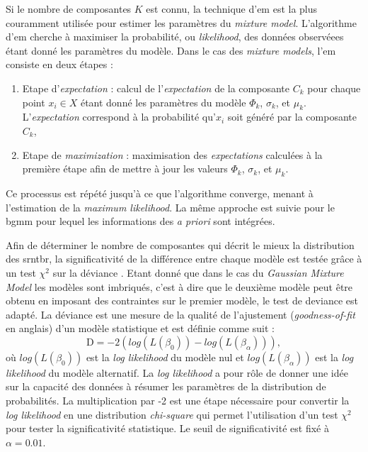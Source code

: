 Si le nombre de composantes $K$ est connu, la technique d'\gls{em} est la plus couramment utilisée pour estimer les paramètres du \textit{mixture model}. L'algorithme d'\gls{em}
cherche à maximiser la probabilité, ou \textit{likelihood}, des données observéees étant donné les paramètres du modèle. Dans le cas des \textit{mixture models}, l'\gls{em}
consiste en deux étapes :
\begin{enumerate}
\item Etape d'\textit{expectation} : calcul de l'\textit{expectation} de la composante $C_k$ pour chaque point $x_i \in X$ étant donné les paramètres du modèle $\Phi_k$, $\sigma_k$,
et $\mu_k$. L'\textit{expectation} correspond à la probabilité qu'$x_i$ soit généré par la composante $C_k$,
\item Etape de \textit{maximization} : maximisation des \textit{expectations} calculées à la première étape afin de mettre à jour les valeurs $\Phi_k$, $\sigma_k$,
et $\mu_k$. 
\end{enumerate}

Ce processus est répété jusqu'à ce que l'algorithme converge, menant à l'estimation de la \textit{maximum likelihood}. La même approche est suivie pour le \gls{bgmm} pour lequel 
les informations des \textit{a priori} sont intégrées. 

Afin de déterminer le nombre de composantes qui décrit le mieux la distribution des \gls{srntbr}, la significativité de la différence entre chaque 
modèle est testée grâce à un test $\chi^2$ sur la déviance \citep{James2013}. Etant donné que dans le cas du \textit{Gaussian Mixture Model} les modèles
sont imbriqués, c'est à dire que le deuxième modèle peut être obtenu en imposant des contraintes sur le premier modèle, le test de 
deviance est adapté. La déviance est une mesure de la qualité de l'ajustement (\textit{goodness-of-fit} 
en anglais) d'un modèle statistique et est définie comme suit :
\begin{equation}
\label{eq:tbr_deviance}
\text{D} = -2(log(L(\beta_{0})) - log(L(\beta_{\alpha}))),
\end{equation}
où $log(L(\beta_{0}))$ est la \textit{log likelihood} du modèle nul et $log(L(\beta_{\alpha}))$ est la \textit{log likelihood} du modèle alternatif. 
La \textit{log likelihood} a pour rôle de donner une idée sur la capacité des données à résumer les paramètres de la distribution de probabilités. 
La multiplication par -2 est une étape nécessaire pour convertir la \textit{log likelihood} en une distribution \textit{chi-square} qui permet 
l'utilisation d'un test $\chi^2$ pour tester la significativité statistique. Le seuil de significativité est fixé à $\alpha = 0.01$.

